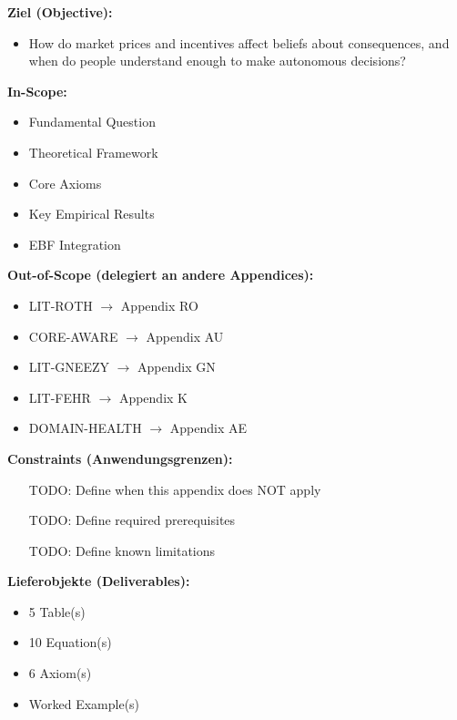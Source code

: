 \begin{tcolorbox}[
    colback=orange!5!white,
    colframe=orange!75!black,
    title={\textbf{Appendix Scope: Ziel / In-Scope / Out-of-Scope / Constraints}},
    fonttitle=\bfseries
]

\textbf{Ziel (Objective):}
\begin{itemize}[nosep]
    \item How do market prices and incentives affect beliefs about consequences, and when do people understand enough to make autonomous decisions?
\end{itemize}

\textbf{In-Scope:}
\begin{itemize}[nosep]
    \item Fundamental Question
    \item Theoretical Framework
    \item Core Axioms
    \item Key Empirical Results
    \item EBF Integration
\end{itemize}

\textbf{Out-of-Scope (delegiert an andere Appendices):}
\begin{itemize}[nosep]
    \item LIT-ROTH $\rightarrow$ Appendix RO
    \item CORE-AWARE $\rightarrow$ Appendix AU
    \item LIT-GNEEZY $\rightarrow$ Appendix GN
    \item LIT-FEHR $\rightarrow$ Appendix K
    \item DOMAIN-HEALTH $\rightarrow$ Appendix AE
\end{itemize}

\textbf{Constraints (Anwendungsgrenzen):}
\begin{itemize}[nosep]
    \item [TODO: Define when this appendix does NOT apply]
    \item [TODO: Define required prerequisites]
    \item [TODO: Define known limitations]
\end{itemize}

\textbf{Lieferobjekte (Deliverables):}
\begin{itemize}[nosep]
    \item 5 Table(s)
    \item 10 Equation(s)
    \item 6 Axiom(s)
    \item Worked Example(s)
\end{itemize}

\end{tcolorbox}


